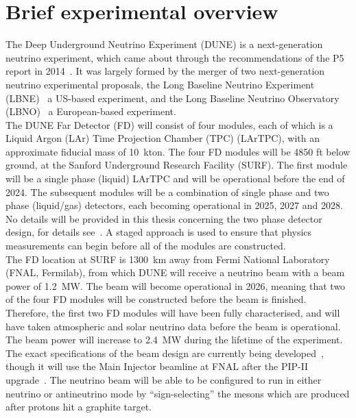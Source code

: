 \section{Brief experimental overview} \label{sec:DUNEOverview}
The Deep Underground Neutrino Experiment (DUNE) is a next-generation neutrino experiment, which came about through the recommendations of the P5 report in 2014~\citep{P5Doc}. It was largely formed by the merger of two next-generation neutrino experimental proposals, the Long Baseline Neutrino Experiment (LBNE)~\citep{LBNE_CDR1, LBNE_CDR2, LBNE_CDR3, LBNE_CDR4, LBNE_CDR5, LBNE_CDR6} a US-based experiment, and the Long Baseline Neutrino Observatory (LBNO)~\citep{LBNO_EOI} a European-based experiment. \\

The DUNE Far Detector (FD) will consist of four modules, each of which is a Liquid Argon (LAr) Time Projection Chamber (TPC) (LArTPC), with an approximate fiducial mass of 10~kton. The four FD modules will be 4850 ft below ground, at the Sanford Underground Research Facility (SURF). The first module will be a single phase (liquid) LArTPC and will be operational before the end of 2024. The subsequent modules will be a combination of single phase and two phase (liquid/gas) detectors, each becoming operational in 2025, 2027 and 2028. No details will be provided in this thesis concerning the two phase detector design, for details see~\citep{DUNECDR_V4}. A staged approach is used to ensure that physics measurements can begin before all of the modules are constructed. \\

The FD location at SURF is 1300~km away from Fermi National Laboratory (FNAL, Fermilab), from which DUNE will receive a neutrino beam with a beam power of 1.2~MW. The beam will become operational in 2026, meaning that two of the four FD modules will be constructed before the beam is finished. Therefore, the first two FD modules will have been fully characterised, and will have taken atmospheric and solar neutrino data before the beam is operational. The beam power will increase to 2.4~MW during the lifetime of the experiment. The exact specifications of the beam design are currently being developed~\citep{DUNECDR_V3}, though it will use the Main Injector beamline at FNAL after the PIP-II upgrade~\citep{PIP-II}. The neutrino beam will be able to be configured to run in either neutrino or antineutrino mode by ``sign-selecting'' the mesons which are produced after protons hit a graphite target. \\


